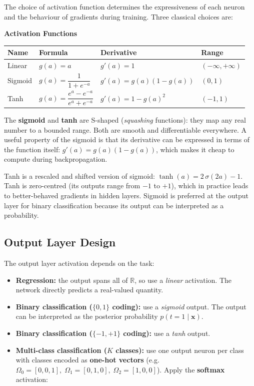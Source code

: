 \documentclass[11pt,a4paper]{article}
\newcommand{\term}[1]{\textcolor{DefGreen}{\textbf{#1}}}
\begin{document}
The choice of activation function determines the expressiveness of each neuron and the behaviour of gradients during training. Three classical choices are:

\begin{tcolorbox}[colback=LightBlue,colframe=AccentBlue,boxrule=0.8pt,arc=3pt]
\textbf{Activation Functions}\\[6pt]
\begin{tabular}{@{}llll@{}}
\toprule
\textbf{Name} & \textbf{Formula} & \textbf{Derivative} & \textbf{Range} \\
\midrule
Linear & $g(a) = a$ & $g'(a) = 1$ & $(-\infty, +\infty)$ \\
Sigmoid & $g(a) = \dfrac{1}{1+e^{-a}}$ & $g'(a) = g(a)(1-g(a))$ & $(0, 1)$ \\
Tanh & $g(a) = \dfrac{e^a - e^{-a}}{e^a + e^{-a}}$ & $g'(a) = 1 - g(a)^2$ & $(-1, 1)$ \\
\bottomrule
\end{tabular}
\end{tcolorbox}

The \term{sigmoid} and \term{tanh} are S-shaped (\emph{squashing} functions): they map any real number to a bounded range. Both are smooth and differentiable everywhere. A useful property of the sigmoid is that its derivative can be expressed in terms of the function itself: $g'(a) = g(a)(1-g(a))$, which makes it cheap to compute during backpropagation.

\begin{notebox}
Tanh is a rescaled and shifted version of sigmoid: $\tanh(a) = 2\,\sigma(2a) - 1$. Tanh is zero-centred (its outputs range from $-1$ to $+1$), which in practice leads to better-behaved gradients in hidden layers. Sigmoid is preferred at the output layer for binary classification because its output can be interpreted as a probability.
\end{notebox}

\subsection{Output Layer Design}

The output layer activation depends on the task:

\begin{itemize}
  \item \textbf{Regression:} the output spans all of $\mathbb{R}$, so use a \emph{linear} activation. The network directly predicts a real-valued quantity.
  \item \textbf{Binary classification ($\{0,1\}$ coding):} use a \emph{sigmoid} output. The output can be interpreted as the posterior probability $p(t=1 \mid \mathbf{x})$.
  \item \textbf{Binary classification ($\{-1,+1\}$ coding):} use a \emph{tanh} output.
  \item \textbf{Multi-class classification ($K$ classes):} use one output neuron per class with classes encoded as \term{one-hot vectors} (e.g.\ $\Omega_0 = [0,0,1],\; \Omega_1 = [0,1,0],\; \Omega_2 = [1,0,0]$). Apply the \term{softmax} activation:
\end{itemize}
\end{document}
